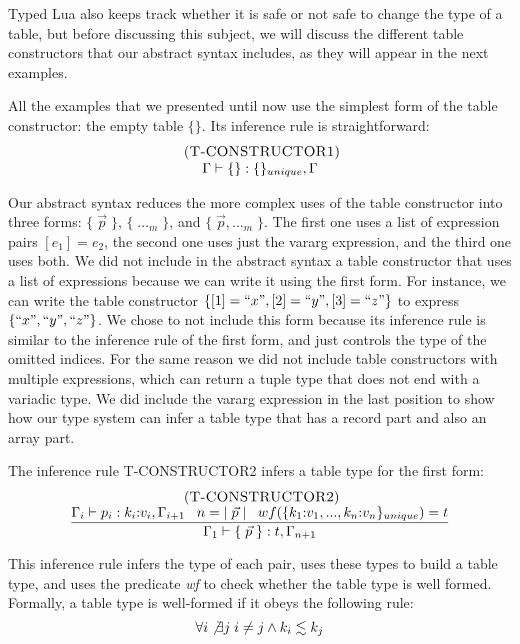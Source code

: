 Typed Lua also keeps track whether it is safe or not safe to
change the type of a table, but before discussing this subject,
we will discuss the different table constructors that our
abstract syntax includes, as they will appear in the next
examples.

All the examples that we presented until now use the simplest form of
the table constructor: the empty table $\{\}$.
Its inference rule is straightforward:
\[
\begin{array}{c}
\; (\textsc{T-CONSTRUCTOR1})\\
\Gamma \vdash \{\}:\{\}_{unique}, \Gamma
\end{array}
\]

Our abstract syntax reduces the more complex uses of the table
constructor into three forms: $\{\;\vec{p}\;\}$, $\{\;{...}_{m}\;\}$,
and $\{\;\vec{p},{...}_{m}\;\}$.
The first one uses a list of expression pairs $[e_{1}] = e_{2}$,
the second one uses just the vararg expression, and the third one uses both.
We did not include in the abstract syntax a table constructor
that uses a list of expressions because we can write it using the first form.
For instance, we can write the table constructor
$\{ [1] = ``x", [2] = ``y", [3] = ``z" \}$ to express $\{ ``x", ``y", ``z" \}$.
We chose to not include this form because its inference rule is similar
to the inference rule of the first form, and just controls the type of
the omitted indices.
For the same reason we did not include table constructors with
multiple expressions, which can return a tuple type that does not end
with a variadic type.
We did include the vararg expression in the last position to show how
our type system can infer a table type that has a record part and
also an array part.

The inference rule \textsc{T-CONSTRUCTOR2} infers a table type for
the first form:
\[
\begin{array}{c}
\; (\textsc{T-CONSTRUCTOR2})\\
\dfrac{\Gamma_{i} \vdash p_{i}:k_{i}{:}v_{i}, \Gamma_{i+1} \;\;\;
       n = |\;\vec{p}\;| \;\;\;
       wf(\{k_{1}{:}v_{1}, ..., k_{n}{:}v_{n}\}_{unique}) = t}
      {\Gamma_{1} \vdash \{\;\vec{p}\;\}:t, \Gamma_{n+1}}
\end{array}
\]

This inference rule infers the type of each pair, uses these types
to build a table type, and uses the predicate \emph{wf} to check
whether the table type is well formed.
Formally, a table type is well-formed if it obeys the following rule:
\[
\forall i \not\exists j \; i \not= j \wedge k_{i} \lesssim k_{j}
\]

